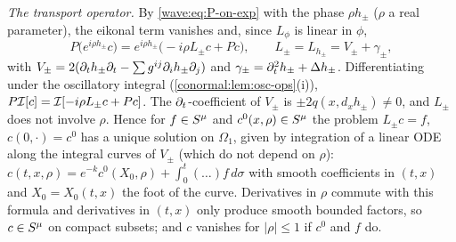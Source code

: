 \emph{The transport operator.} By \eqref{wave:eq:P-on-exp} with the phase $\rho h_\pm$ ($\rho$ a
real parameter), the eikonal term vanishes and, since $L_\phi$ is linear in $\phi$,
\begin{equation*}
  P\big(e^{i\rho h_\pm}c\big)=e^{i\rho h_\pm}\big(-i\rho L_\pm c+Pc\big),\qquad L_\pm=L_{h_\pm}=V_\pm+\gamma_\pm,
\end{equation*}
with $V_\pm=2(\partial_th_\pm\partial_t-\sum g^{ij}\partial_ih_\pm\partial_j)$ and $\gamma_\pm=\partial_t^2h_\pm+\Delta h_\pm$.
Differentiating under the oscillatory integral (\cref{conormal:lem:osc-ops}(i)),
$P\mathcal{I}[c]=\mathcal{I}[-i\rho L_\pm c+Pc]$. The $\partial_t$-coefficient of $V_\pm$ is $\pm2q(x,d_xh_\pm)\ne0$, and
$L_\pm$ does not involve $\rho$. Hence for $f\in S^{\mu}$ and $c^0(x,\rho)\in S^{\mu}$ the problem
$L_\pm c=f$, $c(0,\cdot)=c^0$ has a unique solution on $\Omega_1$, given by integration of a linear
ODE along the integral curves of $V_\pm$ (which do not depend on $\rho$):
$c(t,x,\rho)=e^{-k}c^0(X_0,\rho)+\int_0^t(\dots)f\,d\sigma$ with smooth coefficients in $(t,x)$
and $X_0=X_0(t,x)$ the foot of the curve. Derivatives in $\rho$ commute with this formula and
derivatives in $(t,x)$ only produce smooth bounded factors, so $c\in S^{\mu}$ on compact subsets;
and $c$ vanishes for $|\rho|\le1$ if $c^0$ and $f$ do.

